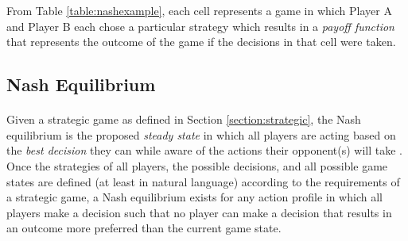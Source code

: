 \noindent From Table \ref{table:nashexample}, each cell represents a game in which Player A and Player B each chose a particular strategy which results in a \textit{payoff function} that represents the outcome of the game if the decisions in that cell were taken.

\subsection{Nash Equilibrium} \label{section:nash}

\paragraph{} Given a strategic game as defined in Section \ref{section:strategic}, the Nash equilibrium is the proposed \textit{steady state} in which all players are acting based on the \textit{best decision} they can while aware of the actions their opponent(s) will take \cite[Section 2.2]{osborne1994}. Once the strategies of all players, the possible decisions, and all possible game states are defined (at least in natural language) according to the requirements of a strategic game, a Nash equilibrium exists for any action profile in which all players make a decision such that no player can make a decision that results in an outcome more preferred than the current game state.
